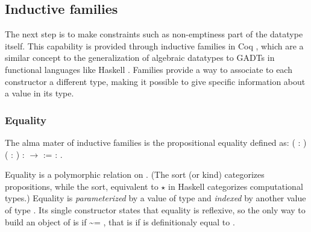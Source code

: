 \subsection{Inductive families}




   The next step is to make constraints such as non-emptiness part of the 
   datatype itself. This capability is provided through inductive families in
   Coq \cite{paulin93tlca}, which are a similar concept to the generalization 
   of algebraic datatypes to GADTs in functional languages like Haskell 
   \cite{GADTcomplete}. Families provide a way to associate to each constructor 
   a different type, making it possible to give specific information about a value 
   in its type. 


\subsubsection{Equality}


   The alma mater of inductive families is the propositional equality 
    defined as: \coqdoceol
\coqdocemptyline
\coqdocnoindent
{}  ( : ) ( : ) :  \ensuremath{\rightarrow}  := \coqdoceol
\coqdocindent{0.50em}
 :    . 

\coqdocemptyline


   Equality is a polymorphic relation on . (The  sort (or kind) categorizes
   propositions, while the  sort, equivalent to $\star$ in Haskell categorizes 
   computational types.) Equality is \textit{parameterized} by a value  of type  and 
   \textit{indexed} by another value of type . Its single constructor states that 
   equality is reflexive, so the only way to build an object of    is if 
    \~{}= , that is if  is definitionaly equal to . 


